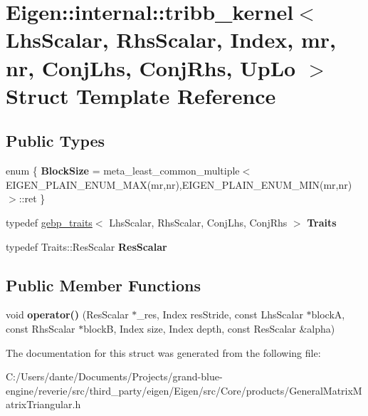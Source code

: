 \hypertarget{struct_eigen_1_1internal_1_1tribb__kernel}{}\section{Eigen\+::internal\+::tribb\+\_\+kernel$<$ Lhs\+Scalar, Rhs\+Scalar, Index, mr, nr, Conj\+Lhs, Conj\+Rhs, Up\+Lo $>$ Struct Template Reference}
\label{struct_eigen_1_1internal_1_1tribb__kernel}
\subsection*{Public Types}
\begin{DoxyCompactItemize}
\item 
\mbox{\label{struct_eigen_1_1internal_1_1tribb__kernel_abb4d317ffc84a8cfb10ffb0b24125fa6}} 
enum \{ {\bfseries Block\+Size} = meta\+\_\+least\+\_\+common\+\_\+multiple$<$E\+I\+G\+E\+N\+\_\+\+P\+L\+A\+I\+N\+\_\+\+E\+N\+U\+M\+\_\+\+M\+AX(mr,nr),E\+I\+G\+E\+N\+\_\+\+P\+L\+A\+I\+N\+\_\+\+E\+N\+U\+M\+\_\+\+M\+IN(mr,nr)$>$\+::ret
 \}
\item 
\mbox{\label{struct_eigen_1_1internal_1_1tribb__kernel_adfdbc6d9102ae5b765743360e77e7566}} 
typedef \mbox{\hyperlink{class_eigen_1_1internal_1_1gebp__traits}{gebp\+\_\+traits}}$<$ Lhs\+Scalar, Rhs\+Scalar, Conj\+Lhs, Conj\+Rhs $>$ {\bfseries Traits}
\item 
\mbox{\label{struct_eigen_1_1internal_1_1tribb__kernel_a7fc9a3aab6f0858799970d6dad0bc189}} 
typedef Traits\+::\+Res\+Scalar {\bfseries Res\+Scalar}
\end{DoxyCompactItemize}
\subsection*{Public Member Functions}
\begin{DoxyCompactItemize}
\item 
\mbox{\label{struct_eigen_1_1internal_1_1tribb__kernel_a6e248061b97d4af03d1f605ac89766c8}} 
void {\bfseries operator()} (Res\+Scalar $\ast$\+\_\+res, Index res\+Stride, const Lhs\+Scalar $\ast$blockA, const Rhs\+Scalar $\ast$blockB, Index size, Index depth, const Res\+Scalar \&alpha)
\end{DoxyCompactItemize}


The documentation for this struct was generated from the following file\+:\begin{DoxyCompactItemize}
\item 
C\+:/\+Users/dante/\+Documents/\+Projects/grand-\/blue-\/engine/reverie/src/third\+\_\+party/eigen/\+Eigen/src/\+Core/products/General\+Matrix\+Matrix\+Triangular.\+h\end{DoxyCompactItemize}
